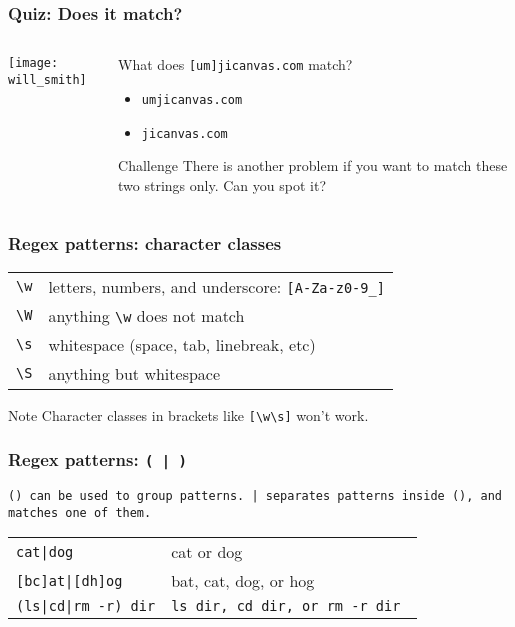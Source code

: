 \begin{frame}[fragile]
\frametitle{Quiz: Does it match?}
\begin{columns}
    \begin{column}{0.4\textwidth}
        \texttt{[image: will\_smith]}
    \end{column}
    \begin{column}{0.6\textwidth}
        What does \Large \verb|[um]jicanvas.com| \normalsize match?
        \begin{itemize}
            \item \tt{umjicanvas.com}
            \item \tt{jicanvas.com} %
        \end{itemize}
        \vspace{1cm}

        \pause
        \begin{block}{Challenge}
            There is another problem if you want to match these two strings
            only. Can you spot it?
        \end{block}
    \end{column}
\end{columns}
\end{frame}

\begin{frame}[fragile]
\frametitle{Regex patterns: character classes}
\begin{table}
    \centering
    \begin{tabular}{ll}
        \verb|\w|           & letters, numbers, and underscore:
                              \verb|[A-Za-z0-9_]| \\
        \verb|\W|           & anything \verb|\w| does not match \\
        \verb|\s|           & whitespace (space, tab, linebreak, etc) \\
        \verb|\S|           & anything but whitespace \\
    \end{tabular}
\end{table}

\begin{block}{Note}
    Character classes in brackets like \verb|[\w\s]| won't work.
\end{block}
\end{frame}

\begin{frame}[fragile]
\frametitle{Regex patterns: \tt{( | )}}
\tt{()} can be used to group patterns.
\tt{|} separates patterns inside \tt{()}, and matches one of them.
\begin{table}
    \centering
    \begin{tabular}{ll}
        \verb!cat|dog!              & cat or dog \\
        \verb![bc]at|[dh]og!        & bat, cat, dog, or hog \\
        \verb!(ls|cd|rm -r) dir!    & \tt{ls dir}, \tt{cd dir}, or \tt{rm -r dir} \\
    \end{tabular}
\end{table}
\end{frame}

